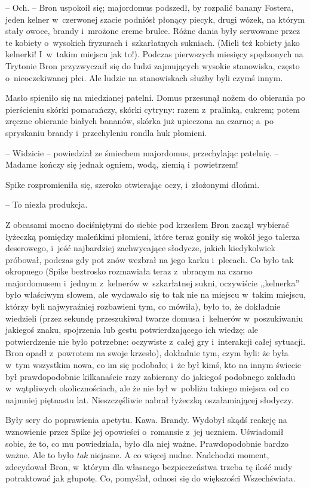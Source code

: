 \documentclass[oneside,polish,11pt,rmheadings]{mwbk}
\begin{document}
-- Och. -- Bron uspokoił się; majordomus podszedł, by rozpalić banany Fostera, jeden kelner w~czerwonej szacie podniósł płonący piecyk, drugi wózek, na którym stały owoce, brandy i~mrożone creme brulee. Różne dania były serwowane przez te kobiety o~wysokich fryzurach i~szkarłatnych sukniach. (Mieli też kobiety jako kelnerki! I~w~takim miejscu jak to!). Podczas pierwszych miesięcy spędzonych na Trytonie Bron przyzwyczaił się do ludzi zajmujących wysokie stanowiska, często o~nieoczekiwanej płci. Ale ludzie na stanowiskach służby byli czymś innym. 

Masło spieniło się na miedzianej patelni. Domus przesunął nożem do obierania po pierścieniu skórki pomarańczy, skórki cytryny: razem z~pralinką, cukrem; potem zręczne obieranie białych bananów, skórka już upieczona na czarno; a~po spryskaniu brandy i~przechyleniu rondla huk płomieni. 

-- Widzicie -- powiedział ze śmiechem majordomus, przechylając patelnię. -- Madame kończy się jednak ogniem, wodą, ziemią i~powietrzem! 

Spike rozpromieniła się, szeroko otwierając oczy, i~złożonymi dłońmi. 

-- To niezła produkcja. 

Z obcasami mocno dociśniętymi do siebie pod krzesłem Bron zaczął wybierać łyżeczką pomiędzy maleńkimi płomieni, które teraz goniły się wokół jego talerza deserowego, i~jeść najbardziej zachwycające słodycze, jakich kiedykolwiek próbował, podczas gdy pot znów wezbrał na jego karku i~plecach. Co było tak okropnego (Spike beztrosko rozmawiała teraz z~ubranym na czarno majordomusem i~jednym z~kelnerów w~szkarłatnej sukni, oczywiście ,,kelnerka'' było właściwym słowem, ale wydawało się to tak nie na miejscu w~takim miejscu, którzy byli najwyraźniej rozbawieni tym, co mówiła), było to, że dokładnie wiedzieli (przez sekundę przeszukiwał twarze domusa i~kelnerów w~poszukiwaniu jakiegoś znaku, spojrzenia lub gestu potwierdzającego ich wiedzę; ale potwierdzenie nie było potrzebne: oczywiste z~całej gry i~interakcji całej sytuacji. Bron opadł z~powrotem na swoje krzesło), dokładnie tym, czym byli: że była w~tym wszystkim nowa, co im się podobało; i~że był kimś, kto na innym świecie był prawdopodobnie kilkanaście razy zabierany do jakiegoś podobnego zakładu w~wątpliwych okolicznościach, ale że nie był w~pobliżu takiego miejsca od co najmniej piętnastu lat. Nieszczęśliwie nabrał łyżeczką oszałamiającej słodyczy. 

Były sery do poprawienia apetytu. Kawa. Brandy. Wydobył skądś reakcję na wznowienie przez Spike jej opowieści o~romansie z~jej uczniem. Uświadomił sobie, że to, co mu powiedziała, było dla niej ważne. Prawdopodobnie bardzo ważne. Ale to było \textit{tak }niejasne. A co więcej nudne. Nadchodzi moment, zdecydował Bron, w~którym dla własnego bezpieczeństwa trzeba tę ilość nudy potraktować jak głupotę. Co, pomyślał, odnosi się do większości Wszechświata. 
\end{document}
